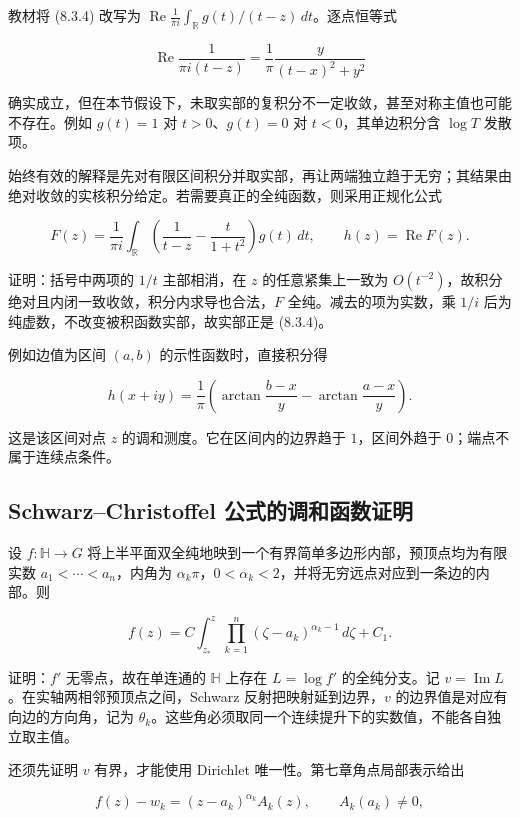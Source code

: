 \documentclass[11pt,a4paper]{article}
\begin{document}
教材将 (8.3.4) 改写为
\(\operatorname{Re}\frac1{\pi i}\int_{\mathbb R}g(t)/(t-z)\,dt\)。逐点恒等式

\[
\operatorname{Re}\frac1{\pi i(t-z)}=\frac1\pi\frac{y}{(t-x)^2+y^2}\tag{8.3.B}
\]

确实成立，但在本节假设下，未取实部的复积分不一定收敛，甚至对称主值也可能不存在。例如
\(g(t)=1\) 对 \(t>0\)、\(g(t)=0\) 对 \(t<0\)，其单边积分含 \(\log T\)
发散项。

始终有效的解释是先对有限区间积分并取实部，再让两端独立趋于无穷；其结果由绝对收敛的实核积分给定。若需要真正的全纯函数，则采用正规化公式

\[
F(z)=\frac1{\pi i}\int_{\mathbb R}
\left(\frac1{t-z}-\frac{t}{1+t^2}\right)g(t)\,dt,
\qquad h(z)=\operatorname{Re}F(z).\tag{8.3.C}
\]

证明：括号中两项的 \(1/t\) 主部相消，在 \(z\) 的任意紧集上一致为
\(O(t^{-2})\)，故积分绝对且内闭一致收敛，积分内求导也合法，\(F\)
全纯。减去的项为实数，乘 \(1/i\)
后为纯虚数，不改变被积函数实部，故实部正是 (8.3.4)。

例如边值为区间 \((a,b)\) 的示性函数时，直接积分得

\[
h(x+iy)=\frac1\pi\left(\arctan\frac{b-x}{y}-\arctan\frac{a-x}{y}\right).\tag{8.3.D}
\]

这是该区间对点 \(z\) 的调和测度。它在区间内的边界趋于 \(1\)，区间外趋于
\(0\)；端点不属于连续点条件。

\subsection*{Schwarz--Christoffel 公式的调和函数证明}\label{ch08-s3-heading-4}

设 \(f:\mathbb H\to G\)
将上半平面双全纯地映到一个有界简单多边形内部，预顶点均为有限实数
\(a_1<\cdots<a_n\)，内角为
\(\alpha_k\pi\)，\(0<\alpha_k<2\)，并将无穷远点对应到一条边的内部。则

\[
f(z)=C\int_{z_*}^{z}\prod_{k=1}^n(\zeta-a_k)^{\alpha_k-1}\,d\zeta+C_1.\tag{8.3.6}
\]

证明：\(f'\) 无零点，故在单连通的 \(\mathbb H\) 上存在 \(L=\log f'\)
的全纯分支。记 \(v=\operatorname{Im}L\)。在实轴两相邻预顶点之间，Schwarz
反射把映射延到边界，\(v\) 的边界值是对应有向边的方向角，记为
\(\theta_k\)。这些角必须取同一个连续提升下的实数值，不能各自独立取主值。

还须先证明 \(v\) 有界，才能使用 Dirichlet 唯一性。第七章角点局部表示给出

\[
f(z)-w_k=(z-a_k)^{\alpha_k}A_k(z),\qquad A_k(a_k)\ne0,\tag{8.3.E}
\]
\end{document}
